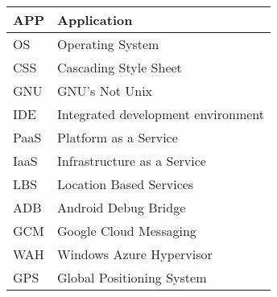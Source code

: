 



\begin{longtable}{p{90pt}l}
\hline APP      & Application \\
\hline OS     	& Operating System \\
\hline CSS 		& Cascading Style Sheet \\
\hline GNU      & GNU's Not Unix \\
\hline IDE      & Integrated development environment \\
\hline PaaS		& Platform as a Service \\
\hline IaaS     & Infrastructure as a Service \\
\hline LBS      & Location Based Services \\
\hline ADB      & Android Debug Bridge \\
\hline GCM       & Google Cloud Messaging \\
\hline WAH       & Windows Azure Hypervisor \\
\hline GPS       & Global Positioning System \\



\hline
\end{longtable}






